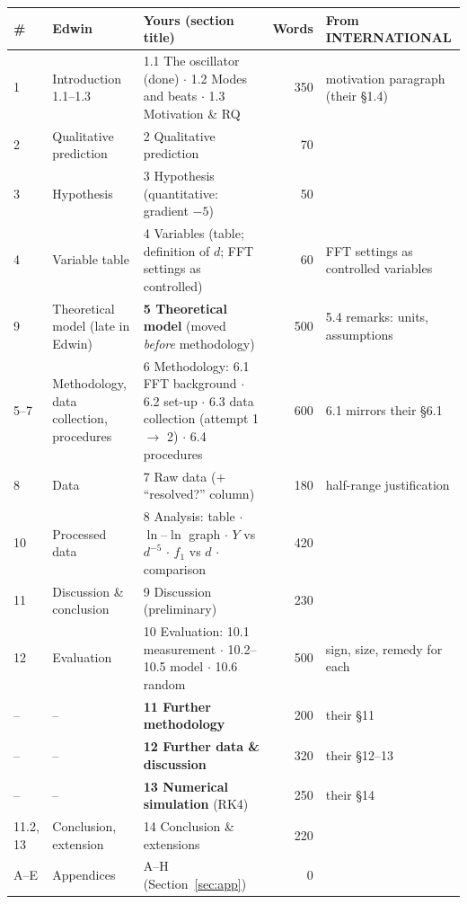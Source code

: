 \documentclass[11pt,a4paper]{article}
\newcommand{\Y}{Y}                       %
\begin{document}
\begin{center}\small
\begin{tabular}{@{}p{0.8cm} p{2.9cm} p{6.5cm} r p{3.5cm}@{}}
\toprule
\# & Edwin & Yours (section title) & Words & From INTERNATIONAL \\
\midrule
1 & Introduction 1.1--1.3 & 1.1 The oscillator (done) $\cdot$ 1.2 Modes and beats $\cdot$ 1.3 Motivation \& RQ & 350 & motivation paragraph (their \S1.4) \\
2 & Qualitative prediction & 2 Qualitative prediction & 70 & \\
3 & Hypothesis & 3 Hypothesis (quantitative: gradient $-5$) & 50 & \\
4 & Variable table & 4 Variables (table; definition of $d$; FFT settings as controlled) & 60 & FFT settings as controlled variables \\
9 & Theoretical model (late in Edwin) & \textbf{5 Theoretical model} (moved \emph{before} methodology) & 500 & 5.4 remarks: units, assumptions \\
5--7 & Methodology, data collection, procedures & 6 Methodology: 6.1 FFT background $\cdot$ 6.2 set-up $\cdot$ 6.3 data collection (attempt 1 $\to$ 2) $\cdot$ 6.4 procedures & 600 & 6.1 mirrors their \S6.1 \\
8 & Data & 7 Raw data ($+$ ``resolved?'' column) & 180 & half-range justification \\
10 & Processed data & 8 Analysis: table $\cdot$ $\ln$--$\ln$ graph $\cdot$ $\Y$ vs $d^{-5}$ $\cdot$ $f_1$ vs $d$ $\cdot$ comparison & 420 & \\
11 & Discussion \& conclusion & 9 Discussion (preliminary) & 230 & \\
12 & Evaluation & 10 Evaluation: 10.1 measurement $\cdot$ 10.2--10.5 model $\cdot$ 10.6 random & 500 & sign, size, remedy for each \\
-- & -- & \textbf{11 Further methodology} & 200 & their \S11 \\
-- & -- & \textbf{12 Further data \& discussion} & 320 & their \S12--13 \\
-- & -- & \textbf{13 Numerical simulation} (RK4) & 250 & their \S14 \\
11.2, 13 & Conclusion, extension & 14 Conclusion \& extensions & 220 & \\
A--E & Appendices & A--H (Section~\ref{sec:app}) & 0 & \\
\bottomrule
\end{tabular}
\end{center}
\end{document}
